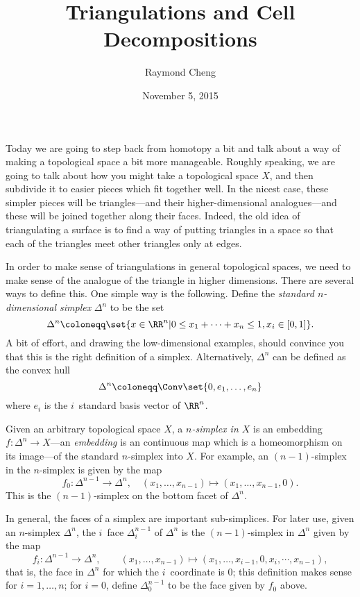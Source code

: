 \documentclass{axolotl}
\title{Triangulations and Cell Decompositions}
\author{Raymond Cheng}
\date{November 5, 2015}
\begin{document}
\maketitle
Today we are going to step back from homotopy a bit and talk about a way of
making a topological space a bit more manageable. Roughly speaking, we are
going to talk about how you might take a topological space \(X\), and then
subdivide it to easier pieces which fit together well. In the nicest case,
these simpler pieces will be triangles---and their higher-dimensional
analogues---and these will be joined together along their faces. Indeed, the
old idea of triangulating a surface is to find a way of putting
triangles in a space so that each of the triangles meet other triangles only
at edges.

In order to make sense of triangulations in general topological spaces, we need
to make sense of the analogue of the triangle in higher dimensions. There are
several ways to define this. One simple way is the following. Define the \emph{standard
  \(n\)-dimensional simplex} \(\Delta^n\) to be the set
\[ \Delta^n \coloneqq \set{x \in \RR^n | 0 \leq x_1 + \cdots + x_n \leq 1, x_i \in [0,1]}. \]
A bit of effort, and drawing the low-dimensional examples, should convince you
that this is the right definition of a simplex. Alternatively, \(\Delta^n\) can
be defined as the convex hull
\[ \Delta^n \coloneqq \Conv\set{0,e_1,\ldots,e_n} \]
where \(e_i\) is the \(i\)\ssth~standard basis vector of \(\RR^n\).

Given an arbitrary topological space \(X\), a \emph{\(n\)-simplex in \(X\)} is an
embedding \(f: \Delta^n \to X\)---an \emph{embedding} is an continuous map which
is a homeomorphism on its image---of the standard \(n\)-simplex into \(X\). For
example, an \((n-1)\)-simplex in the \(n\)-simplex is given by the map
\[ f_0: \Delta^{n-1} \to \Delta^n, \quad (x_1,\ldots,x_{n-1}) \mapsto (x_1,\ldots,x_{n-1},0). \]
This is the \((n-1)\)-simplex on the bottom facet of \(\Delta^n\).

In general, the faces of a simplex are important sub-simplices. For later use,
given an \(n\)-simplex \(\Delta^n\), the \(i\)\ssth~face \(\Delta^{n-1}_i\) of
\(\Delta^n\) is the \((n-1)\)-simplex in \(\Delta^n\) given by the map \[ f_i:
  \Delta^{n-1} \to \Delta^n, \qquad (x_1,\ldots,x_{n-1}) \mapsto
  (x_1,\ldots,x_{i-1},0,x_{i},\cdots,x_{n-1}), \] that is, the face in
\(\Delta^n\) for which the \(i\)\ssth~coordinate is \(0\); this definition
makes sense for \(i = 1,\ldots,n\); for \(i = 0\), define \(\Delta^{n-1}_0\) to
be the face given by \(f_0\) above.
\end{document}
